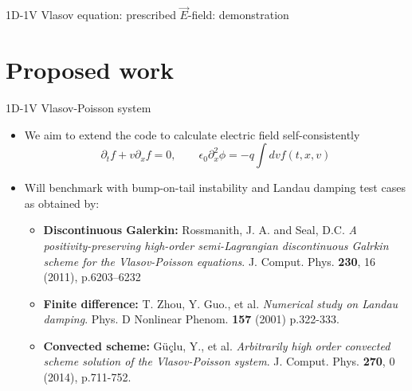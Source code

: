 \documentclass{beamer}
\begin{document}

\begin{frame}{1D-1V Vlasov equation: prescribed $\vec{E}$-field: demonstration}


\end{frame}


\section{Proposed work}
 

\begin{frame}


\end{frame}


\begin{frame}{1D-1V Vlasov-Poisson system}
\begin{itemize}
\item We aim to extend the code to calculate electric field self-consistently
$$\partial_t f + v\partial_x f = 0, \qquad  \epsilon_0\partial_x^2\phi = -q \int dv f(t,x,v)$$
\item Will benchmark with bump-on-tail instability and Landau damping test cases as obtained by:
\begin{itemize}
\item \textbf{Discontinuous Galerkin:} Rossmanith, J. A. and Seal, D.C. \emph{A positivity-preserving high-order semi-Lagrangian discontinuous Galrkin scheme for the Vlasov-Poisson equations}. J. Comput. Phys. \textbf{230}, 16 (2011), p.6203--6232 
\item \textbf{Finite difference:} T. Zhou, Y. Guo., et al. \emph{Numerical study on Landau damping}. Phys. D Nonlinear Phenom. \textbf{157} (2001) p.322-333.
     \item \textbf{Convected scheme:} G\"{u}\c{c}lu, Y., et al. \emph{Arbitrarily high order convected scheme solution of the Vlasov-Poisson system}. J. Comput. Phys. \textbf{270}, 0 (2014), p.711-752.
\end{itemize}
\end{itemize}
\end{frame}
   
\end{document}
